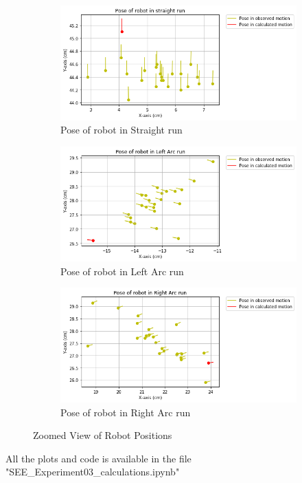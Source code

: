 \documentclass[10pt,a4paper]{article}
\begin{document}
						 \begin{figure}[H]
							 	\begin{subfigure}{0.5\textwidth}
							 		\centering
							 		\includegraphics[width=0.8\linewidth]{img/scatter_plot_st.png}
							 		\caption{Pose of robot in Straight run}
							 	\end{subfigure}
							 	\hfill
							 	\begin{subfigure}{0.5\textwidth}
							 		\centering
							 		\includegraphics[width=0.8\linewidth]{img/scatter_plot_lt.png}
							 		\caption{Pose of robot in Left Arc run}
							 	\end{subfigure}
							 	\begin{subfigure}{0.5\textwidth}
							 		\centering
							 		\includegraphics[width=0.8\linewidth]{img/scatter_plot_rt.png}
							 		\caption{Pose of robot in Right Arc run}
							 	\end{subfigure}
							 	\caption{Zoomed View of Robot Positions}
					     \end{figure}	
					All the plots and code is available in the file "SEE\_Experiment03\_calculations.ipynb"\\
\end{document}
